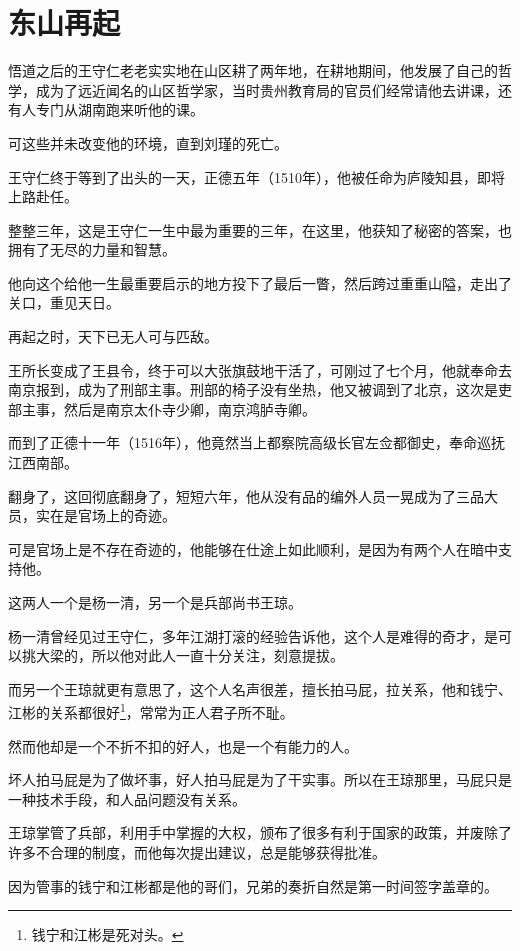 \section{东山再起}
\ifnum{}
	\begin{multicols}{\theparacolNo}
\fi
悟道之后的王守仁老老实实地在山区耕了两年地，在耕地期间，他发展了自己的哲学，成为了远近闻名的山区哲学家，当时贵州教育局的官员们经常请他去讲课，还有人专门从湖南跑来听他的课。

可这些并未改变他的环境，直到刘瑾的死亡。

王守仁终于等到了出头的一天，正德五年（1510年），他被任命为庐陵知县，即将上路赴任。

整整三年，这是王守仁一生中最为重要的三年，在这里，他获知了秘密的答案，也拥有了无尽的力量和智慧。

他向这个给他一生最重要启示的地方投下了最后一瞥，然后跨过重重山隘，走出了关口，重见天日。

再起之时，天下已无人可与匹敌。

王所长变成了王县令，终于可以大张旗鼓地干活了，可刚过了七个月，他就奉命去南京报到，成为了刑部主事。刑部的椅子没有坐热，他又被调到了北京，这次是吏部主事，然后是南京太仆寺少卿，南京鸿胪寺卿。

而到了正德十一年（1516年），他竟然当上都察院高级长官左佥都御史，奉命巡抚江西南部。

翻身了，这回彻底翻身了，短短六年，他从没有品的编外人员一晃成为了三品大员，实在是官场上的奇迹。

可是官场上是不存在奇迹的，他能够在仕途上如此顺利，是因为有两个人在暗中支持他。

这两人一个是杨一清，另一个是兵部尚书王琼。

杨一清曾经见过王守仁，多年江湖打滚的经验告诉他，这个人是难得的奇才，是可以挑大梁的，所以他对此人一直十分关注，刻意提拔。

而另一个王琼就更有意思了，这个人名声很差，擅长拍马屁，拉关系，他和钱宁、江彬的关系都很好\footnote{钱宁和江彬是死对头。}，常常为正人君子所不耻。

然而他却是一个不折不扣的好人，也是一个有能力的人。

坏人拍马屁是为了做坏事，好人拍马屁是为了干实事。所以在王琼那里，马屁只是一种技术手段，和人品问题没有关系。

王琼掌管了兵部，利用手中掌握的大权，颁布了很多有利于国家的政策，并废除了许多不合理的制度，而他每次提出建议，总是能够获得批准。

因为管事的钱宁和江彬都是他的哥们，兄弟的奏折自然是第一时间签字盖章的。


\end{multicols}
